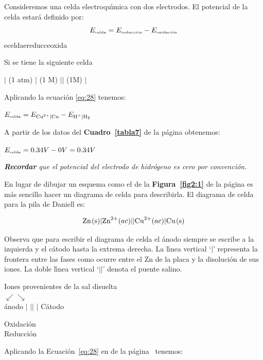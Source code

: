 Consideremos una celda electroqu\'{\i}mica con dos
electrodos.  El potencial de
la celda  estar\'a definido por:
\begin{equation}
E_{\textrm{\tiny celda}} = E_{\textrm{\tiny reducci\'on}}-E_{\textrm{\tiny oxidaci\'on}}
\label{eq:28}
\end{equation}
\gls{ecelda}\gls{ereducc}\gls{eoxida}
\begin{example}
Si se tiene la siguiente celda

\begin{center}
$|$ (1 atm) $|$  (1 M) $||$  (1M) $|$ 
\end{center}
Aplicando la ecuaci\'on \ref{eq:28} tenemos:
\begin{center}
$E_{\textrm{\tiny celda}} = E_{\ce{Cu^2+}|\ce{Cu}}-E_{\ce{H+}|\ce{H2}}$
\end{center}
A partir de los datos del \textbf{Cuadro~\ref{tabla7}} de la p\'agina \pageref{tabla7} obtenemos:
\begin{center}
$E_{\textrm{\tiny celda}} = 0.34  V - 0 V =  0.34 V$
\end{center}
\textit{\textbf{Recordar} que el potencial del electrodo de hidr\'ogeno es cero
por convenci\'on.}
\end{example}


En lugar de  dibujar un esquema como el de la \textbf{Figura~\ref{fig2:1}} de la
p\'agina \pageref{fig2:1} es m\'as sencillo hacer un diagrama de celda para describirla. El
diagrama de
 celda para la pila de Daniell  es:

$$\ce{Zn(s)}|\ce{Zn^2+}(ac)||\ce{Cu^2+}(ac)|\ce{Cu(s)}$$

Observa que para escribir el diagrama de celda el \'anodo siempre se escribe a la izquierda
y el c\'atodo hasta la extrema derecha. La l\'{\i}nea vertical `$|$' representa la frontera
entre las fases como ocurre entre el Zn de la placa y la disoluci\'on de sus iones. La doble
l\'{\i}nea vertical `$||$' denota el puente salino.
\begin{center}
Iones provenientes de la sal disuelta\\
$\swarrow \searrow$\\
\'anodo $|$ $||$  $|$   C\'atodo
\end{center}
\begin{description}
\item[Oxidaci\'on] 
\item[Reducci\'on] 
\end{description}
Aplicando la Ecuaci\'on~\ref{eq:28} en de la p\'agina~\pageref{eq:28} tenemos:

